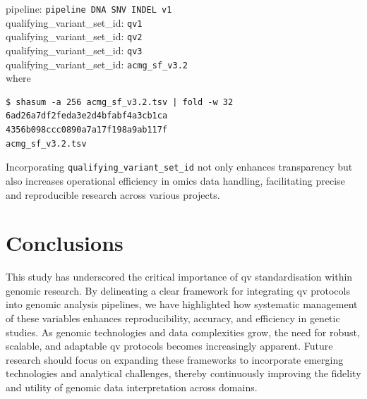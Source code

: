 \begin{tcolorbox}[
    colback=white!0,  %
    colframe=black,  %
    boxrule=1pt,  %
    arc=1mm,  %
    outer arc=1mm,
   title=\textbf{\refstepcounter{myboxcounter}\label{box:example_concept}Box \themyboxcounter: Example implementation}
]

pipeline: \colorbox{colorSUNSET1!30}{\texttt{pipeline DNA SNV INDEL v1}}\\
qualifying\_variant\_set\_id: \colorbox{colorSUNSET2!60}{\texttt{qv1}}\\
qualifying\_variant\_set\_id: \colorbox{colorSUNSET2!60}{\texttt{qv2}}\\
qualifying\_variant\_set\_id: \colorbox{colorSUNSET2!60}{\texttt{qv3}}\\
qualifying\_variant\_set\_id: \colorbox{colorSUNSET2!60}{\texttt{acmg\_sf\_v3.2}}\\

where 
\begin{verbatim}
$ shasum -a 256 acmg_sf_v3.2.tsv | fold -w 32
6ad26a7df2feda3e2d4bfabf4a3cb1ca
4356b098ccc0890a7a17f198a9ab117f
acmg_sf_v3.2.tsv
\end{verbatim}
\end{tcolorbox}

Incorporating \texttt{qualifying\_variant\_set\_id} not only enhances transparency but also increases operational efficiency in omics data handling, facilitating precise and reproducible research across various projects.


\section{Conclusions}
This study has underscored the critical importance of \ac{qv} standardisation within genomic research. 
By delineating a clear framework for integrating \ac{qv} protocols into genomic analysis pipelines, we have highlighted how systematic management of these variables enhances reproducibility, accuracy, and efficiency in genetic studies.
As genomic technologies and data complexities grow, the need for robust, scalable, and adaptable \ac{qv} protocols becomes increasingly apparent. 
Future research should focus on expanding these frameworks to incorporate emerging technologies and analytical challenges, thereby continuously improving the fidelity and utility of genomic data interpretation across domains.


